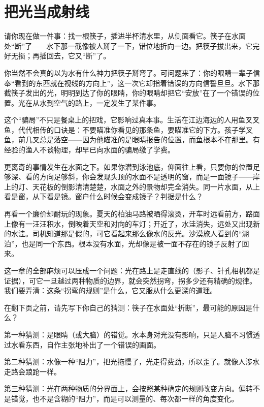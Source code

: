 \chapter{把光当成射线}


请你现在做一件事：找一根筷子，插进半杯清水里，从侧面看它。筷子在水面处“断”了——水下那一截像被人掰了一下，错位地折向一边。把筷子拔出来，它完好无损；再插回去，它又“断”了。

你当然不会真的以为水有什么神力把筷子掰弯了。可问题来了：你的眼睛一辈子信奉“看到的东西就在视线的方向上”，这一次它却指着错误的方向信誓旦旦。水下那截筷子发出的光，明明到达了你的眼睛，你的眼睛却把它“安放”在了一个错误的位置。光在从水到空气的路上，一定发生了某件事。

这个“骗局”不只是餐桌上的把戏，它影响过真本事。生活在江边海边的人用鱼叉叉鱼，代代相传的口诀是：不要瞄准你看见的那条鱼，要瞄准它的下方。孩子学叉鱼，前几叉总是落空——因为他瞄准的是眼睛报告的位置，而鱼根本不在那里。有经验的渔人不谈物理，却早已向水面的骗局缴了学费。

更离奇的事情发生在水面之下。如果你潜到泳池底，仰面往上看，只要你的位置足够深、看的方向足够斜，你会发现头顶的水面不是透明的窗，而是一面镜子——岸上的灯、天花板的倒影清清楚楚，水面之外的景物却完全消失。同一片水面，从上看是窗，从下看是镜。窗户什么时候会变成镜子？判据是什么？

再看一个廉价却耐玩的现象。夏天的柏油马路被晒得滚烫，开车时远看前方，路面上像有一汪汪积水，倒映着天空和对向的车灯；开近了，水洼消失，远处又出现新的水洼。司机知道那是假的，可它看起来那么像水的反光。沙漠旅人看到的“湖泊”，也是同一个东西。根本没有水面，光却像是被一面不存在的镜子反射了回来。

\begin{mainline}
这一章的全部麻烦可以压成一个问题：光在路上是走直线的（影子、针孔相机都是证据），可它一旦越过两种物质的边界，就会突然拐弯，拐多少还有精确的规律。我们要弄清：这条“拐弯的规则”是什么，它又服从什么更深的道理。
\end{mainline}


在翻下页之前，请先写下你自己的猜测：筷子在水面处“折断”，最可能的原因是什么？

第一种猜测：是眼睛（或大脑）的错觉。水本身对光没有影响，只是人脑不习惯透过水看东西，自作主张地补出了一个错误的画面。

第二种猜测：水像一种“阻力”，把光拖慢了，光走得费劲，所以歪了。就像人涉水走路会踉跄一样。

第三种猜测：光在两种物质的分界面上，会按照某种确定的规则改变方向。偏转不是错觉，也不是含糊的“阻力”，而是可以测量的、每次都一样的角度变化。

